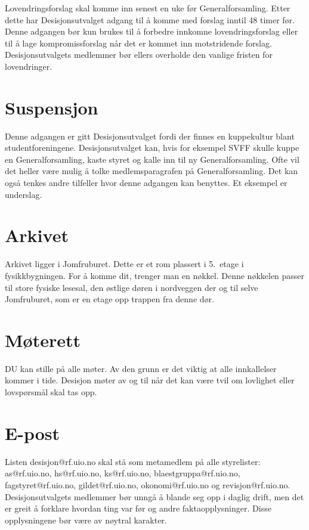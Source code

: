 Lovendringsforslag skal komme inn senest en uke før Generalforsamling. Etter dette har Desisjonsutvalget
adgang til å komme med forslag inntil 48 timer før. Denne adgangen bør kun brukes til å forbedre
innkomne lovendringsforslag eller til å lage kompromissforslag når det er kommet inn motstridende
forslag. Desisjonsutvalgets medlemmer bør ellers overholde den vanlige fristen for lovendringer.

\section{Suspensjon}
Denne adgangen er gitt Desisjonsutvalget fordi der finnes en kuppekultur blant 
studentforeningene. Desisjonsutvalget kan, hvis for eksempel SVFF skulle kuppe en Generalforsamling,
kaste styret og kalle inn til ny Generalforsamling. Ofte vil det heller være mulig å tolke
medlemsparagrafen på Generalforsamling. Det kan også tenkes andre tilfeller hvor denne adgangen
kan benyttes. Et eksempel er underslag.

\section{Arkivet}
Arkivet ligger i Jomfruburet. Dette er et rom plassert i 5.~etage i fysikkbygningen. For å komme
dit, trenger man en nøkkel. Denne nøkkelen passer til store fysiske lesesal, den østlige døren i 
nordveggen der og til selve Jomfruburet, som er en etage opp trappen fra denne dør.

\section{Møterett}
DU kan stille på alle møter. Av den grunn er det viktig at alle innkallelser kommer i tide. Desisjon
møter av og til når det kan være tvil om lovlighet eller lovspørsmål skal tas opp.

\section{E-post}
Listen desisjon@rf.uio.no skal stå som metamedlem på alle styrelister: as@rf.uio.no, hs@rf.uio.no, ks@rf.uio.no,
blaestgruppa@rf.uio.no, fagstyret@rf.uio.no, gildet@rf.uio.no, okonomi@rf.uio.no og revisjon@rf.uio.no. Desisjonsutvalgets
medlemmer bør unngå å blande seg opp i daglig drift, men det er greit å forklare hvordan ting var før og andre
faktaopplysninger. Disse opplysningene bør være av nøytral karakter.

